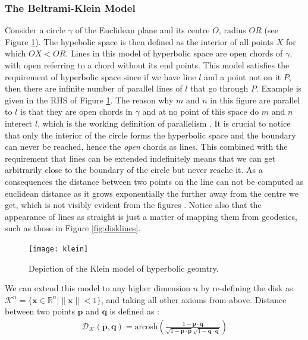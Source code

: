 \documentclass[12pt]{report}
\begin{document}
\subsubsection{The Beltrami-Klein Model}
Consider a circle $\gamma$ of the Euclidean plane and its centre $O$, radius $OR$ (see Figure \ref{fig:klein}). The hypebolic space is then defined as the interior of all points $X$ for which $OX < OR$. Lines in this model of hyperbolic space are open chords of $\gamma$, with open referring to a chord without its end points. This model satisfies the requirement of hyperbolic space since if we have line $l$ and a point not on it $P$, then there are infinite number of parallel lines of $l$ that go through $P$. Example is given in the RHS of Figure \ref{fig:klein}. The reason why $m$ and $n$ in this figure are parallel to $l$ is that they are open chords in $\gamma$ and at no point of this space do $m$ and $n$ interect $l$, which is the working definition of parallelism \cite{Greenberg1994}. It is crucial to notice that only the interior of the circle forms the hyperbolic space and the boundary can never be reached, hence the \textit{open} chords as lines. This combined with the requirement that lines can be extended indefinitely means that we can get arbitrarily close to the boundary of the circle but never reache it. As a consequences the distance between two points on the line can not be computed as euclidean distance as it grows exponentially the further away from the centre we get, which is not visibly evident from the figures \cite{Greenberg1994}. Notice also that the appearance of lines as straight is just a matter of mapping them from geodesics, such as those in Figure \ref{fig:disklines}. 

\begin{figure}
  \centering
	\texttt{[image: klein]}
	\caption{Depiction of the Klein model of hyperbolic geomtry.}
	\label{fig:klein}
\end{figure}

We can extend this model to any higher dimension $n$ by re-defining the disk as $\mathcal{K}^n = \{\mathbf{x} \in \mathbb{R}^n | \lVert \mathbf{x} \rVert <1 \}$, and taking all other axioms from above. Distance between two points $\mathbf{p}$ and $\mathbf{q}$ is defined as \cite{Iversen1992}:
\begin{align}
  \mathcal{D_K}(\mathbf{p}, \mathbf{q}) = \text{arcosh} \left( \frac{1 - \mathbf{p} \cdot \mathbf{q}}{\sqrt{1-\mathbf{p}\cdot \mathbf{p}}\sqrt{1-\mathbf{q}\cdot \mathbf{q}}}   \right) 
\end{align}
\end{document}
